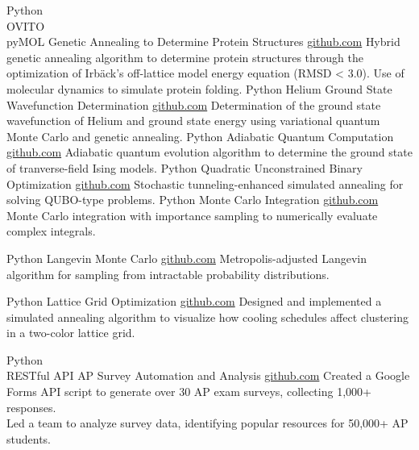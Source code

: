 \documentclass[9pt]{developercv} %
\begin{document}
\begin{entrylist}
    \entry
		{Python \\ OVITO \\ pyMOL }
		{Genetic Annealing to Determine Protein Structures}
		{\href{https://github.com/lonelyneutrin0/Protein-Structure-Prediction}{github.com}}
		{Hybrid genetic annealing algorithm to determine protein structures through the optimization of Irbäck's off-lattice model energy equation (RMSD < 3.0). Use of molecular dynamics to simulate protein folding.}
    \entry
		{Python}
		{Helium Ground State Wavefunction Determination}
		{\href{https://github.com/lonelyneutrin0/QMCGA}{github.com}}
		{Determination of the ground state wavefunction of Helium and ground state energy using variational quantum Monte Carlo and genetic annealing.}
	\entry
		{Python}
		{Adiabatic Quantum Computation}
		{\href{https://github.com/lonelyneutrin0/QA}{github.com}}
		{Adiabatic quantum evolution algorithm to determine the ground state of tranverse-field Ising models.}
	\entry
		{Python}
		{Quadratic Unconstrained Binary Optimization}
		{\href{https://github.com/lonelyneutrin0/qubo}{github.com}}
		{Stochastic tunneling-enhanced simulated annealing for solving QUBO-type problems.}
	\entry
		{Python}
		{Monte Carlo Integration}
		{\href{https://github.com/lonelyneutrin0/MNI}{github.com}}
		{Monte Carlo integration with importance sampling to numerically evaluate complex integrals.}
	
	\entry
		{Python}
		{Langevin Monte Carlo}
		{\href{https://github.com/lonelyneutrin0/LMC}{github.com}}
		{Metropolis-adjusted Langevin algorithm for sampling from intractable probability distributions.}
	
	\entry
		{Python}
		{Lattice Grid Optimization}
		{\href{https://github.com/lonelyneutrin0/lattice_grid}{github.com}}
		{Designed and implemented a simulated annealing algorithm to visualize how cooling schedules affect clustering in a two-color lattice grid.}
	
	\entry
	{Python \\ RESTful API}
	{AP Survey Automation and Analysis}
	{\href{https://github.com/lonelyneutrin0/APSurveyAutomation}{github.com}}
	{Created a Google Forms API script to generate over 30 AP exam surveys, collecting 1,000+ responses.\\Led a team to analyze survey data, identifying popular resources for 50,000+ AP students.}
	\end{entrylist}
	
\end{document}
